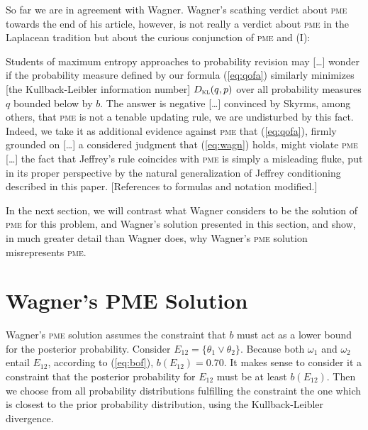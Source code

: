 \documentclass[phd,12pt,oneside]{ubcthesis}
\begin{document}
So far we are in agreement with Wagner. Wagner's scathing verdict
about \textsc{pme} towards the end of his article, however, is not really a
verdict about \textsc{pme} in the Laplacean tradition but about the curious
conjunction of \textsc{pme} and (I):

\begin{quotex}
  Students of maximum entropy approaches to probability revision may
  [\ldots] wonder if the probability measure defined by our formula
  (\ref{eq:qofa}) similarly minimizes [the Kullback-Leibler
  information number] $D_{\textsc{kl}}(q,p)$ over all probability
  measures $q$ bounded below by $b$. The answer is negative [\ldots]
  convinced by Skyrms, among others, that \textsc{pme} is not a
  tenable updating rule, we are undisturbed by this fact. Indeed, we
  take it as additional evidence against \textsc{pme} that
  (\ref{eq:qofa}), firmly grounded on [\ldots] a considered judgment
  that (\ref{eq:wagn}) holds, might violate \textsc{pme} [\ldots]
  the fact that Jeffrey's rule coincides with \textsc{pme} is
  simply a misleading fluke, put in its proper perspective by the
  natural generalization of Jeffrey conditioning described in
  this paper. [References to formulas and notation modified.]
\end{quotex}

In the next section, we will contrast what Wagner considers to be the
solution of \textsc{pme} for this problem,  and
Wagner's solution presented in this section,  and show, in much greater detail than Wagner does, why
Wagner's \textsc{pme} solution misrepresents \textsc{pme}.

\section{Wagner's PME Solution}
\label{sec:gaephuiw}

Wagner's \textsc{pme} solution assumes the constraint that $b$ must act as a
lower bound for the posterior probability. Consider
$E_{12}=\{\theta_{1}\vee\theta_{2}\}$. Because both $\omega_{1}$ and
$\omega_{2}$ entail $E_{12}$, according to (\ref{eq:bof}),
$b(E_{12})=0.70$. It makes sense to consider it a constraint that the
posterior probability for $E_{12}$ must be at least $b(E_{12})$. Then
we choose from all probability distributions fulfilling the constraint
the one which is closest to the prior probability distribution, using
the Kullback-Leibler divergence.
\end{document}
